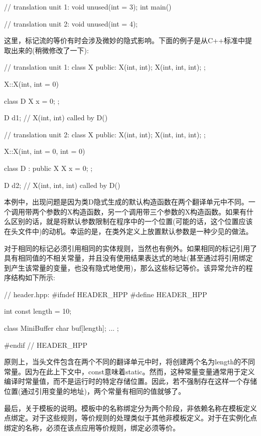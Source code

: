 \begin{cpp}
// translation unit 1:
void unused(int = 3);
int main()
{ }

// translation unit 2:
void unused(int = 4);
\end{cpp}

这里，标记流的等价有时会涉及微妙的隐式影响。下面的例子是从C++标准中提取出来的(稍微修改了一下):

\begin{cpp}
// translation unit 1:
class X {
	public:
	X(int, int);
	X(int, int, int);
};

X::X(int, int = 0)
{ }

class D {
	X x = 0;
};

D d1; // X(int, int) called by D()

// translation unit 2:
class X {
	public:
	X(int, int);
	X(int, int, int);
};

X::X(int, int = 0, int = 0)
{ }

class D : public X {
	X x = 0;
};

D d2; // X(int, int, int) called by D()
\end{cpp}

本例中，出现问题是因为类D隐式生成的默认构造函数在两个翻译单元中不同。一个调用带两个参数的X构造函数，另一个调用带三个参数的X构造函数。如果有什么区别的话，就是将默认参数限制在程序中的一个位置(可能的话，这个位置应该在头文件中)的动机。幸运的是，在类外定义上放置默认参数是一种少见的做法。

对于相同的标记必须引用相同的实体规则，当然也有例外。如果相同的标记引用了具有相同值的不相关常量，并且没有使用结果表达式的地址(甚至通过将引用绑定到产生该常量的变量，也没有隐式地使用)，那么这些标记等价。该异常允许的程序结构如下所示:

\begin{cpp}
// header.hpp:
#ifndef HEADER_HPP
#define HEADER_HPP

int const length = 10;

class MiniBuffer {
	char buf[length];
	...
};

#endif // HEADER_HPP
\end{cpp}

原则上，当头文件包含在两个不同的翻译单元中时，将创建两个名为length的不同常量。因为在此上下文中，const意味着static。然而，这种常量变量通常用于定义编译时常量值，而不是运行时的特定存储位置。因此，若不强制存在这样一个存储位置(通过引用变量的地址)，两个常量有相同的值就够了。

最后，关于模板的说明。模板中的名称绑定分为两个阶段，非依赖名称在模板定义点绑定。对于这些规则，等价规则的处理类似于其他非模板定义。对于在实例化点绑定的名称，必须在该点应用等价规则，绑定必须等价。





